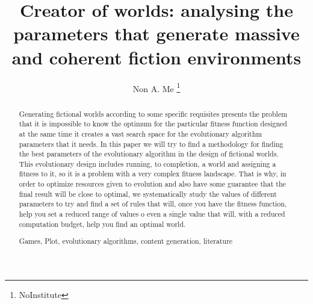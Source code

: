 \documentclass[runningheads,a4paper]{llncs}
\newcommand{\keywords}[1]{\par\addvspace\baselineskip
\noindent\keywordname\enspace\ignorespaces#1}
\begin{document}
\mainmatter  %

\title{Creator of worlds: analysing the parameters that generate massive and coherent fiction environments}


%
%
\author{Non A. Me%
\thanks{NoInstitute}}
%


%
%

\maketitle


\begin{abstract}
Generating fictional worlds according to some specific requisites
presents the problem that it is impossible to know the optimum for the
particular fitness function designed at the same time it creates a
vast search space for the evolutionary algorithm parameters that it
needs. In this paper we will try to find a methodology for finding the
best parameters of the evolutionary algorithm in the design of
fictional worlds. This evolutionary design includes running, to
completion, a world and assigning a fitness to it, so it is a problem
with a very complex fitness landscape. That is why, in order to
optimize resources given to evolution and also have some guarantee
that the final result will be close to optimal, we systematically
study the values of different parameters to try and find a set of
rules that will, once you have the fitness function, help you set a
reduced range of values o even a single value that will, with a
reduced computation budget, help you find an optimal world.

\keywords{Games, Plot, evolutionary algorithms, content generation, literature}
\end{abstract}
\end{document}
